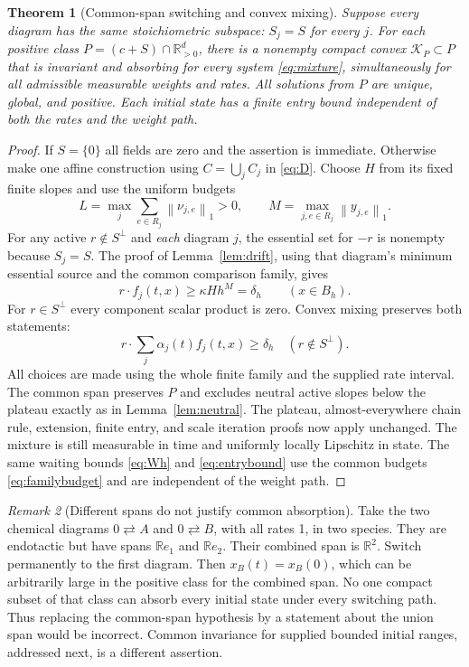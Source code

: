 \documentclass[11pt]{article}
\newtheorem{theorem}{Theorem}[section]
\theoremstyle{definition}
\theoremstyle{remark}
\newtheorem{remark}[theorem]{Remark}
\newcommand{\R}{\mathbb R}
\newcommand{\norm}[1]{\left\|#1\right\|}
\numberwithin{equation}{section}
\begin{document}
\begin{theorem}[Common-span switching and convex mixing]
\label{thm:switching}
Suppose every diagram has the same stoichiometric subspace:
$S_j=S$ for every $j$. For each positive class
$P=(c+S)\cap\R_{>0}^d$, there is a nonempty compact convex
$\mathcal K_P\subset P$ that is invariant and absorbing for
every system \eqref{eq:mixture}, simultaneously for all
admissible measurable weights and rates. All solutions from
$P$ are unique, global, and positive. Each initial state has
a finite entry bound independent of both the rates and the
weight path.
\end{theorem}
\begin{proof}
If $S=\{0\}$ all fields are zero and the assertion is immediate.
Otherwise make one affine construction using $C=\bigcup_j C_j$
in \eqref{eq:D}. Choose $H$ from its fixed finite slopes and
use the uniform budgets
\begin{equation}
 L=\max_j\sum_{e\in R_j}\norm{\nu_{j,e}}_1>0,\qquad
 M=\max_{j,e\in R_j}\norm{y_{j,e}}_1.
 \label{eq:familybudget}
\end{equation}
For any active $r\notin S^\perp$ and \emph{each} diagram $j$,
the essential set for $-r$ is nonempty because $S_j=S$.
The proof of Lemma~\ref{lem:drift}, using that diagram's
minimum essential source and the common comparison family,
gives
\[
 r\cdot f_j(t,x)\geq\kappa Hh^M=\delta_h
             \qquad(x\in B_h).
\]
For $r\in S^\perp$ every component scalar product is zero.
Convex mixing preserves both statements:
\[
 r\cdot\sum_j\alpha_j(t)f_j(t,x)\geq\delta_h
                      \quad(r\notin S^\perp).
\]
All choices are made using the whole finite family and the
supplied rate interval. The common span preserves $P$ and
excludes neutral active slopes below the plateau exactly as
in Lemma~\ref{lem:neutral}. The plateau, almost-everywhere
chain rule, extension, finite entry, and scale iteration
proofs now apply unchanged. The mixture is still measurable
in time and uniformly locally Lipschitz in state. The same
waiting bounds \eqref{eq:Wh} and \eqref{eq:entrybound} use
the common budgets \eqref{eq:familybudget} and are independent
of the weight path.
\end{proof}

\begin{remark}[Different spans do not justify common absorption]
\label{rem:span}
Take the two chemical diagrams $0\rightleftarrows A$ and
$0\rightleftarrows B$, with all rates 1, in two species.
They are endotactic but have spans $\R e_1$ and $\R e_2$.
Their combined span is $\R^2$. Switch permanently to the
first diagram. Then $x_B(t)=x_B(0)$, which can be arbitrarily
large in the positive class for the combined span. No one
compact subset of that class can absorb every initial state
under every switching path. Thus replacing the common-span
hypothesis by a statement about the union span would be
incorrect. Common invariance for supplied bounded initial
ranges, addressed next, is a different assertion.
\end{remark}
\end{document}
